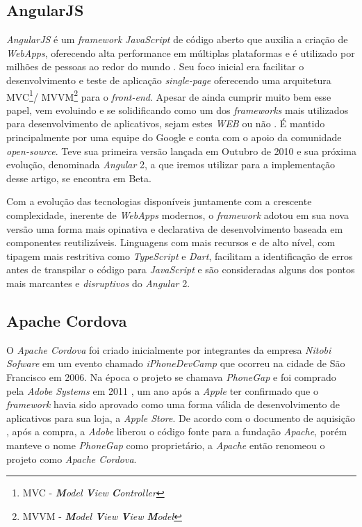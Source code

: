 \subsection{\esp AngularJS}
\textit{AngularJS} é um \textit{framework} \textit{JavaScript} de código aberto que auxilia a criação de \textit{WebApps}, oferecendo alta performance em múltiplas plataformas e é utilizado por milhões de pessoas ao redor do mundo \cite{angularjs}. Seu foco inicial era facilitar o desenvolvimento e teste de aplicação \textit{single-page} oferecendo uma arquitetura MVC\footnote[1]{MVC - \textit{\textbf{M}odel \textbf{V}iew \textbf{C}ontroller}}/ MVVM\footnote[2]{MVVM - \textit{\textbf{M}odel \textbf{V}iew \textbf{V}iew \textbf{M}odel}} para o \textit{front-end}. Apesar de ainda cumprir muito bem esse papel, vem evoluindo e se solidificando como um dos \textit{frameworks} mais utilizados para desenvolvimento de aplicativos, sejam estes \textit{WEB} ou não \cite{angularjs}. É mantido principalmente por uma equipe do Google e conta com o apoio da comunidade \textit{open-source}. Teve sua primeira versão lançada em Outubro de 2010 e sua próxima evolução, denominada \textit{Angular} 2, a que iremos utilizar para a implementação desse artigo, se encontra em Beta.  

Com a evolução das tecnologias disponíveis juntamente com a crescente complexidade, inerente de \textit{WebApps} modernos, o \textit{framework} adotou em sua nova versão uma forma mais opinativa e declarativa de desenvolvimento baseada em componentes reutilizáveis. Linguagens com mais recursos e de alto nível, com tipagem mais restritiva como \textit{TypeScript} e \textit{Dart}, facilitam a identificação de erros antes de transpilar o código para \textit{JavaScript} e são consideradas alguns dos pontos mais marcantes e \textit{disruptivos} do \textit{Angular} 2.

\subsection{\esp Apache Cordova}

O \textit{Apache Cordova} foi criado inicialmente por integrantes da empresa \textit{Nitobi Sofware} em um evento chamado \textit{iPhoneDevCamp} que ocorreu na cidade de São Francisco em 2006. Na época o projeto se chamava \textit{PhoneGap} e foi comprado pela \textit{Adobe Systems} em 2011 \cite{Adobe2011}, um ano após a \textit{Apple} ter confirmado que o \textit{framework} havia sido aprovado como uma forma válida de desenvolvimento de aplicativos para sua loja, a \textit{Apple Store}. De acordo com o documento de aquisição \cite{Adobe2011}, após a compra, a \textit{Adobe} liberou o código fonte para a fundação \textit{Apache}, porém manteve o nome \textit{PhoneGap} como proprietário, a \textit{Apache} então renomeou o projeto como \textit{Apache Cordova}.

